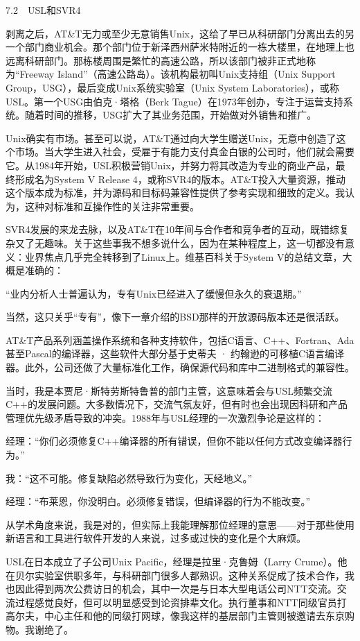 \documentclass[a4paper,12pt,UTF8,twoside]{ctexbook}
\begin{document}
7.2　USL和SVR4


剥离之后，AT\&T无力或至少无意销售Unix，这给了早已从科研部门分离出去的另一个部门商业机会。那个部门位于新泽西州萨米特附近的一栋大楼里，在地理上也远离科研部门。那栋楼周围是繁忙的高速公路，所以该部门被非正式地称为“Freeway Island”（高速公路岛）。该机构最初叫Unix支持组（Unix Support Group，USG），最后变成Unix系统实验室（Unix System Laboratories），或称USL。第一个USG由伯克·塔格（Berk Tague）在1973年创办，专注于运营支持系统。随着时间的推移，USG扩大了其业务范围，开始做对外销售和推广。

Unix确实有市场。甚至可以说，AT\&T通过向大学生赠送Unix，无意中创造了这个市场。当大学生进入社会，受雇于有能力支付真金白银的公司时，他们就会需要它。从1984年开始，USL积极营销Unix，并努力将其改造为专业的商业产品，最终形成名为System V Release 4，或称SVR4的版本。AT\&T投入大量资源，推动这个版本成为标准，并为源码和目标码兼容性提供了参考实现和细致的定义。我认为，这种对标准和互操作性的关注非常重要。

SVR4发展的来龙去脉，以及AT\&T在10年间与合作者和竞争者的互动，既错综复杂又了无趣味。关于这些事我不想多说什么，因为在某种程度上，这一切都没有意义：业界焦点几乎完全转移到了Linux上。维基百科关于System V的总结文章，大概是准确的：

“业内分析人士普遍认为，专有Unix已经进入了缓慢但永久的衰退期。”



当然，这只关乎“专有”，像下一章介绍的BSD那样的开放源码版本还是很活跃。

AT\&T产品系列涵盖操作系统和各种支持软件，包括C语言、C++、Fortran、Ada甚至Pascal的编译器，这些软件大部分基于史蒂夫 · 约翰逊的可移植C语言编译器。此外，公司还做了大量标准化工作，确保源代码和库中二进制格式的兼容性。

当时，我是本贾尼·斯特劳斯特鲁普的部门主管，这意味着会与USL频繁交流C++的发展问题。大多数情况下，交流气氛友好，但有时也会出现因科研和产品管理优先级矛盾导致的冲突。1988年与USL经理的一次激烈争论是这样的：

经理：“你们必须修复C++编译器的所有错误，但你不能以任何方式改变编译器行为。”

我：“这不可能。修复缺陷必然导致行为变化，天经地义。”

经理：“布莱恩，你没明白。必须修复错误，但编译器的行为不能改变。”



从学术角度来说，我是对的，但实际上我能理解那位经理的意思——对于那些使用新语言和工具进行软件开发的人来说，过多或过快的变化是个大麻烦。

USL在日本成立了子公司Unix Pacific，经理是拉里·克鲁姆（Larry Crume）。他在贝尔实验室供职多年，与科研部门很多人都熟识。这种关系促成了技术合作，我也因此得到两次公费访日的机会，其中一次是与日本大型电话公司NTT交流。交流过程感觉良好，但可以明显感受到论资排辈文化。执行董事和NTT同级官员打高尔夫，中心主任和他的同级打网球，像我这样的基层部门主管则被邀请去东京购物。我谢绝了。
\end{document}

